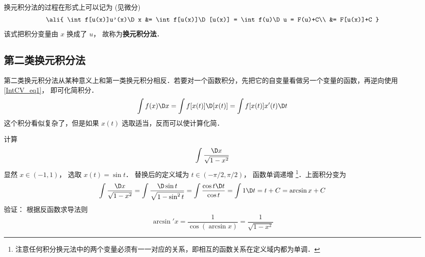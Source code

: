 换元积分法的过程在形式上可以记为 (见微分)
\begin{equation}\label{IntCV_eq1}
\ali{
\int f[u(x)]u'(x)\D x &= \int f[u(x)]\D [u(x)] = \int f(u)\D u = F(u)+C\\
&= F[u(x)]+C
}\end{equation}
该式把积分变量由 $x$ 换成了 $u$， 故称为\textbf{换元积分法}．

\subsection{第二类换元积分法}
第二类换元积分法从某种意义上和第一类换元积分相反．若要对一个函数积分，先把它的自变量看做另一个变量的函数，再逆向使用\autoref{IntCV_eq1}， 即可化简积分．
\begin{equation}\label{IntCV_eq6}
\int f(x)\D x = \int f[x(t)]\D [x(t)] = \int f[x(t)]x'(t)\D t
\end{equation}
这个积分看似复杂了，但是如果 $x\left( t \right)$ 选取适当，反而可以使计算化简．

\begin{exam}{}
计算
\begin{equation}
\int \frac{\D x}{\sqrt{1-x^2}}
\end{equation}
显然 $x \in \left( { - 1,1} \right)$， 选取 $x(t)=\sin t$． 替换后的定义域为 $t \in ( -\pi/2,\pi/2)$， 函数单调递增 \footnote{注意任何积分换元法中的两个变量必须有一一对应的关系，即相互的函数关系在定义域内都为单调．}．上面积分变为
\begin{equation}
\int \frac{\D x}{\sqrt{1-x^2}}  = \int \frac{\D\sin t}{\sqrt{1-\sin^2 t}} = \int \frac{\cos t\D t}{\cos t}  = \int {1\D t}  = t + C = \arcsin x + C
\end{equation}
验证： 根据反函数求导法则
\begin{equation}
\arcsin'x = \frac{1}{{\cos \left( {\arcsin x} \right)}} = \frac{1}{{\sqrt {1 - {x^2}} }}
\end{equation}
\end{exam}




